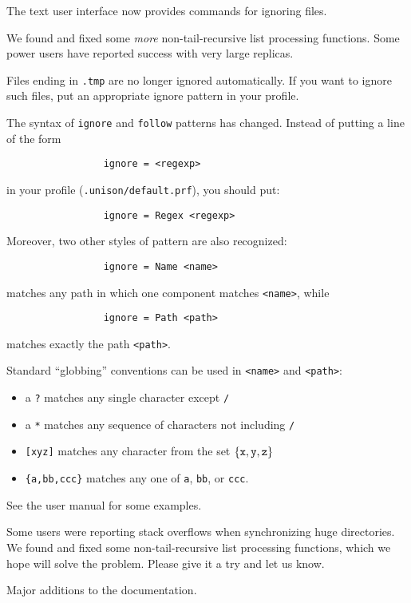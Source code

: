 \begin{changesfromversion}{1.169}
\item The text user interface now provides commands for ignoring
  files.
\item We found and fixed some {\em more} non-tail-recursive list
  processing functions.  Some power users have reported success with
  very large replicas.
\item \incompatible
Files ending in \verb|.tmp| are no longer ignored automatically.  If you want
to ignore such files, put an appropriate ignore pattern in your profile.

\item \incompatible{} The syntax of {\tt ignore} and {\tt follow}
patterns has changed. Instead of putting a line of the form
\begin{verbatim}
                 ignore = <regexp>
\end{verbatim}
  in your profile ({\tt .unison/default.prf}), you should put:
\begin{verbatim}
                 ignore = Regex <regexp>
\end{verbatim}
Moreover, two other styles of pattern are also recognized:
\begin{verbatim}
                 ignore = Name <name>
\end{verbatim}
matches any path in which one component matches \verb|<name>|, while
\begin{verbatim}
                 ignore = Path <path>
\end{verbatim}
matches exactly the path \verb|<path>|.

Standard ``globbing'' conventions can be used in \verb|<name>| and
\verb|<path>|:
\begin{itemize}
\item a \verb|?| matches any single character except \verb|/|
\item a \verb|*| matches any sequence of characters not including \verb|/|
\item \verb|[xyz]| matches any character from the set $\{{\tt x},
  {\tt y}, {\tt z} \}$
\item \verb|{a,bb,ccc}| matches any one of \verb|a|, \verb|bb|, or
  \verb|ccc|.
\end{itemize}

See the user manual for some examples.
\end{changesfromversion}

\begin{changesfromversion}{1.146}
\item Some users were reporting stack overflows when synchronizing
  huge directories.  We found and fixed some non-tail-recursive list
  processing functions, which we hope will solve the problem.  Please
  give it a try and let us know.
\item Major additions to the documentation.
\end{changesfromversion}

